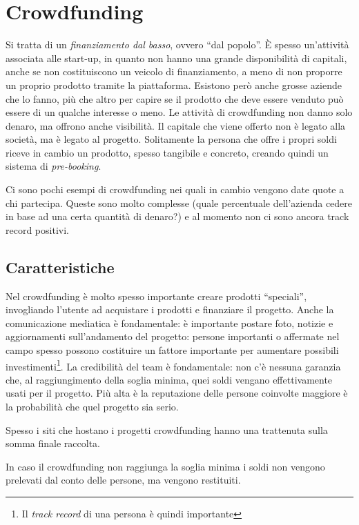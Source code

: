 \section{Crowdfunding}

Si tratta di un \textit{finanziamento dal basso}, ovvero ``dal popolo''. È
spesso un'attività associata alle start-up, in quanto non hanno una grande
disponibilità di capitali, anche se non costituiscono un veicolo di
finanziamento, a meno di non proporre un proprio prodotto tramite la
piattaforma. Esistono però anche grosse aziende che lo fanno, più che altro per
capire se il prodotto che deve essere venduto può essere di un qualche interesse
o meno. Le attività di crowdfunding non danno solo denaro, ma offrono anche
visibilità. Il capitale che viene offerto non è legato alla società, ma è legato
al progetto. Solitamente la persona che offre i propri soldi riceve in cambio un
prodotto, spesso tangibile e concreto, creando quindi un sistema di
\textit{pre-booking}.

Ci sono pochi esempi di crowdfunding nei quali in cambio vengono date quote a
chi partecipa. Queste sono molto complesse (quale percentuale dell'azienda
cedere in base ad una certa quantità di denaro?) e al momento non ci sono
ancora track record positivi.

\subsection{Caratteristiche}

Nel crowdfunding è molto spesso importante creare prodotti ``speciali'',
invogliando l'utente ad acquistare i prodotti e finanziare il progetto. Anche
la comunicazione mediatica è fondamentale: è importante postare foto, notizie e
aggiornamenti sull'andamento del progetto: persone importanti o affermate nel
campo spesso possono costituire un fattore importante per aumentare possibili
investimenti\footnote{Il \textit{track record} di una persona è quindi
importante}. La credibilità del team è fondamentale: non c'è nessuna garanzia
che, al raggiungimento della soglia minima, quei soldi vengano effettivamente
usati per il progetto. Più alta è la reputazione delle persone coinvolte
maggiore è la probabilità che quel progetto sia serio. 

Spesso i siti che hostano i progetti crowdfunding hanno una trattenuta sulla
somma finale raccolta.

In caso il crowdfunding non raggiunga la soglia minima i soldi non vengono
prelevati dal conto delle persone, ma vengono restituiti.


